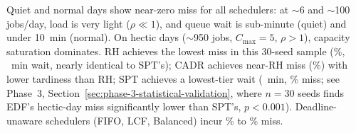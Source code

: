 {\begin{table}[H]
\centering
\caption[Day-type sensitivity summary]{Day-type sensitivity: avg wait (min) / miss\% at $C_{\max}=5$, 20\% tight 1h / 80\% loose 8h deadlines ($n=30$ seeds each). All ten schedulers are shown across the four day types. Bold marks the scheduler with the lowest miss rate in the hectic and surge columns (the whole wait / miss cell), not the lowest wait.}
\label{tab:sensitivity}

\end{table}

Quiet and normal days show near-zero miss for all schedulers: at $\sim$6 and $\sim$100 jobs/day, load is very light ($\rho \ll 1$), and queue wait is sub-minute (quiet) and under 10~min (normal). On hectic days ($\sim$950 jobs, $C_{\max}=5$, $\rho>1$), capacity saturation dominates. RH achieves the lowest miss in this 30-seed sample (\SensHecRHmiss\%, \SensHecRHwait~min wait, nearly identical to SPT's); CADR achieves near-RH miss (\SensHecCADRmiss\%) with lower tardiness than RH; SPT achieves a lowest-tier wait (\SensHecSPTwait~min, \SensHecSPTmiss\% miss; see Phase~3, Section~\ref{sec:phase-3-statistical-validation}, where $n=30$ seeds finds EDF's hectic-day miss significantly lower than SPT's, $p<0.001$). Deadline-unaware schedulers (FIFO, LCF, Balanced) incur \FIFOmiss\% to \Balancedmiss\% miss.

}

